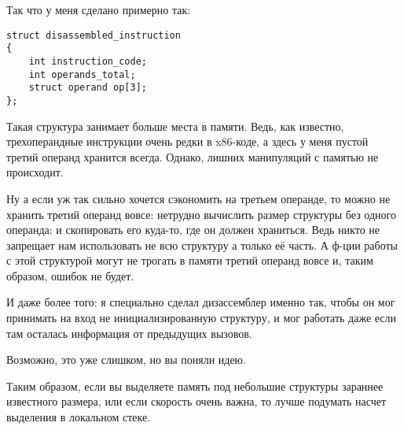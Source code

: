 Так что у меня сделано примерно так:

\begin{lstlisting}
struct disassembled_instruction
{
	int instruction_code;
	int operands_total;
	struct operand op[3];
};
\end{lstlisting}

Такая структура занимает больше места в памяти. Ведь, как известно, трехоперандные инструкции очень редки в x86-коде,
а здесь у меня пустой третий операнд хранится всегда. Однако, лишних манипуляций с памятью не происходит.

Ну а если уж так сильно хочется сэкономить на третьем операнде, то можно не хранить третий операнд вовсе: нетрудно
вычислить размер структуры без одного операнда:  
и скопировать его куда-то, где он должен храниться.
Ведь никто не запрещает нам использовать не всю структуру а только её часть.
А ф-ции работы с этой структурой могут не трогать в памяти третий операнд вовсе и, таким образом, ошибок не будет.

И даже более того: я специально сделал дизассемблер именно так, чтобы он мог принимать на вход не инициализированную
структуру, и мог работать даже если там осталась информация от предыдущих вызовов.

Возможно, это уже слишком, но вы поняли идею.

Таким образом, если вы выделяете память под небольшие структуры зараннее известного размера, или если скорость
очень важна, то лучше подумать насчет выделения в локальном стеке.


